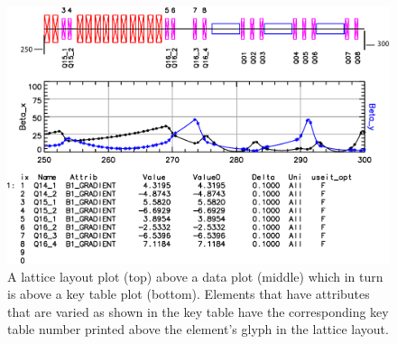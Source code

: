 \begin{figure}
  \centering
  \includegraphics[width=5in]{layout-graph-table.pdf}
  \caption[Example key table with a lattice layout and data plots.]
{A lattice layout plot (top) above a data plot (middle) which in turn is above a key table plot
(bottom). Elements that have attributes that are varied as shown in the key table have the
corresponding key table number printed above the element's glyph in the lattice layout.}
  \label{f:key.table}
\end{figure}

